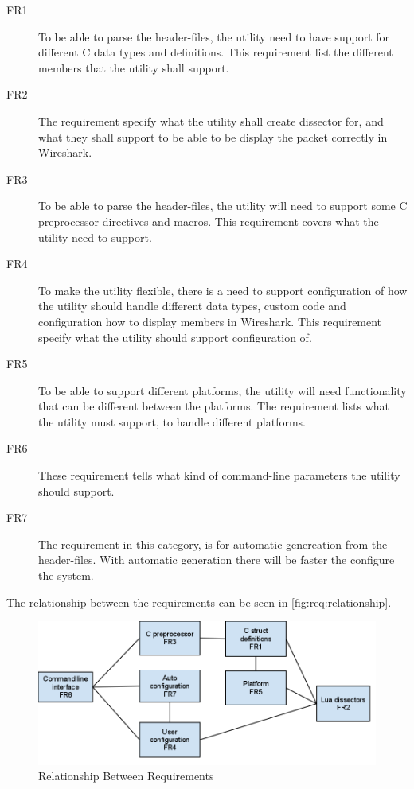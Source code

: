 \begin{description}
	\item[FR1] To be able to parse the header-files, the utility need to have
		 support for different C data types and definitions. This requirement list 
		the different members that the utility shall support.
	\item[FR2] The requirement specify what the utility shall create dissector 
		for, and what they shall support to be able to be display the packet 
		correctly in Wireshark. 
	\item[FR3] To be able to parse the header-files, the utility will need to 
		support some C preprocessor directives and macros. This requirement covers 
		what the utility need to support.
	\item[FR4] To make the utility flexible, there is a need to support 
		configuration of how the utility should handle different data types, custom 
		code and configuration how to display members in Wireshark. This requirement 
		specify what the utility should support configuration of.
	\item[FR5] To be able to support different platforms, the utility will need 
		functionality that can be different between the platforms. The requirement 
		lists what the utility must support, to handle different platforms.
	\item[FR6] These requirement tells what kind of command-line parameters the 
		utility should support. 
	\item[FR7] The requirement in this category, is for automatic genereation 
		from the header-files. With automatic generation there will be faster the 
		configure the system.
\end{description}

The relationship between the requirements can be seen in \autoref{fig:req:relationship}.

\begin{figure}[htbp]
	\center
	\includegraphics[width=\textwidth]{./planning/img/requirement_relationship}
	\caption{Relationship Between Requirements\label{fig:req:relationship}}
\end{figure}


